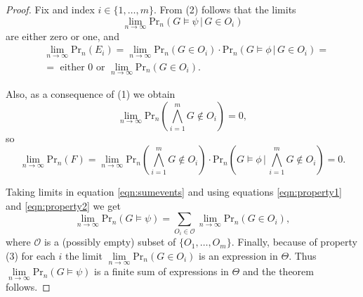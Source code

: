 \documentclass[11pt,notitlepage,a4paper]{article}
\theoremstyle{definition}
\newcommand{\Ln}{\lim\limits_{n\to \infty}}
\begin{document}
\begin{proof}
Fix and index $i\in \{1, \dots, m\}$. From (2) follows that 
the limits 
\[ \Ln \mathrm{Pr}_n(G\models \psi \, | \, G\in O_i )\] 
are either zero or one, and 
\begin{align}\label{eqn:property1}
&\Ln \mathrm{Pr}_n(E_i)= \Ln \mathrm{Pr}_n(G\in O_i)\cdot \mathrm{Pr}_n(G\models \phi \, | \, G\in O_i)=\\ 
&
\nonumber
= \text{ either } 0 \text{ or } \Ln \mathrm{Pr}_n(G\in O_i).
\end{align} 
\par 
Also, as a consequence of (1) we obtain
\[\Ln \mathrm{Pr}_n(\bigwedge_{i=1}^{m} G \notin O_i)=0, \] 
so
\begin{equation}\label{eqn:property2}
\Ln \mathrm{Pr}_n(F)= \Ln \mathrm{Pr}_n(\bigwedge_{i=1}^{m} G \notin O_i)\cdot 
\mathrm{Pr}_n(G\models \phi \, | \, \bigwedge_{i=1}^{m} G \notin O_i)=0.  
\end{equation}
\par
Taking limits in equation \ref{eqn:sumevents} and using equations \ref{eqn:property1} and \ref{eqn:property2} 
we get
\[ \Ln \mathrm{Pr}_n(G\models \psi) = \sum\limits_{O_i\in \mathcal{O}} \Ln
\mathrm{Pr}_n(G \in O_i) ,\]
where $\mathcal{O}$ is a (possibly empty) subset of $\{O_1,\dots, O_{m}\}$.
Finally, because of property (3) for each $i$ the limit $\Ln \mathrm{Pr}_n(G \in O_i)$ is 
an expression in $\Theta$. Thus $\Ln \mathrm{Pr}_n(G\models \psi)$ is a finite sum of expressions in $\Theta$ and the theorem follows.
\end{proof}



\end{document}
